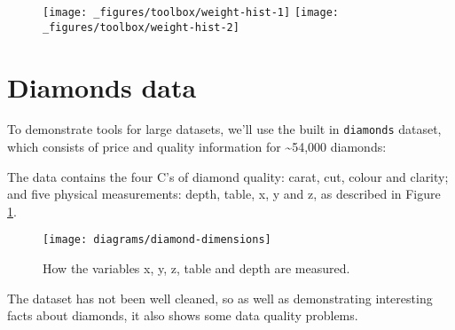 \begin{figure}[H]
  \texttt{[image: \_figures/toolbox/weight-hist-1]}%
  \texttt{[image: \_figures/toolbox/weight-hist-2]}
\end{figure}

\hypertarget{sec:diamonds}{%
\section{Diamonds data}\label{sec:diamonds}}

To demonstrate tools for large datasets, we'll use the built in
\texttt{diamonds} dataset, which consists of price and quality
information for \textasciitilde{}54,000 diamonds:

\begin{Shaded}
\begin{Highlighting}[]
\end{Highlighting}
\end{Shaded}

The data contains the four C's of diamond quality: carat, cut, colour
and clarity; and five physical measurements: depth, table, x, y and z,
as described in Figure \ref{fig:diamond-dim}.

\begin{figure}[htbp]
  \centering
    \texttt{[image: diagrams/diamond-dimensions]}
  \caption{How the variables x, y, z, table and depth are measured.}
  \label{fig:diamond-dim}
\end{figure}

The dataset has not been well cleaned, so as well as demonstrating
interesting facts about diamonds, it also shows some data quality
problems.

